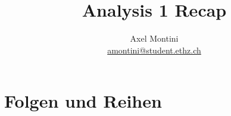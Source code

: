 \documentclass[11pt,a4paper]{article}
\title{Analysis 1 Recap}
\author{Axel Montini \\ \href{mailto:amontini@student.ethz.ch}{amontini@student.ethz.ch}}
\begin{document}
    \maketitle
    
    \section{Folgen und Reihen}
\end{document}
